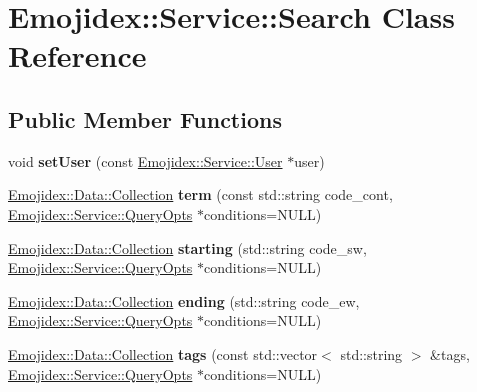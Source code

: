\hypertarget{classEmojidex_1_1Service_1_1Search}{}\section{Emojidex\+:\+:Service\+:\+:Search Class Reference}
\label{classEmojidex_1_1Service_1_1Search}
\subsection*{Public Member Functions}
\begin{DoxyCompactItemize}
\item 
void {\bfseries set\+User} (const \hyperlink{classEmojidex_1_1Service_1_1User}{Emojidex\+::\+Service\+::\+User} $\ast$user)\hypertarget{classEmojidex_1_1Service_1_1Search_ac29e36bb5aed38c8443b4457691a3e7a}{}\label{classEmojidex_1_1Service_1_1Search_ac29e36bb5aed38c8443b4457691a3e7a}

\item 
\hyperlink{classEmojidex_1_1Data_1_1Collection}{Emojidex\+::\+Data\+::\+Collection} {\bfseries term} (const std\+::string code\+\_\+cont, \hyperlink{classEmojidex_1_1Service_1_1QueryOpts}{Emojidex\+::\+Service\+::\+Query\+Opts} $\ast$conditions=N\+U\+LL)\hypertarget{classEmojidex_1_1Service_1_1Search_a7e9de234cfa8cdfe52b9ad02778ec096}{}\label{classEmojidex_1_1Service_1_1Search_a7e9de234cfa8cdfe52b9ad02778ec096}

\item 
\hyperlink{classEmojidex_1_1Data_1_1Collection}{Emojidex\+::\+Data\+::\+Collection} {\bfseries starting} (std\+::string code\+\_\+sw, \hyperlink{classEmojidex_1_1Service_1_1QueryOpts}{Emojidex\+::\+Service\+::\+Query\+Opts} $\ast$conditions=N\+U\+LL)\hypertarget{classEmojidex_1_1Service_1_1Search_a7b90f2dab9c28d2dc971bb7494b4d291}{}\label{classEmojidex_1_1Service_1_1Search_a7b90f2dab9c28d2dc971bb7494b4d291}

\item 
\hyperlink{classEmojidex_1_1Data_1_1Collection}{Emojidex\+::\+Data\+::\+Collection} {\bfseries ending} (std\+::string code\+\_\+ew, \hyperlink{classEmojidex_1_1Service_1_1QueryOpts}{Emojidex\+::\+Service\+::\+Query\+Opts} $\ast$conditions=N\+U\+LL)\hypertarget{classEmojidex_1_1Service_1_1Search_a0c8100ad888ab404088cd44b07bc8b91}{}\label{classEmojidex_1_1Service_1_1Search_a0c8100ad888ab404088cd44b07bc8b91}

\item 
\hyperlink{classEmojidex_1_1Data_1_1Collection}{Emojidex\+::\+Data\+::\+Collection} {\bfseries tags} (const std\+::vector$<$ std\+::string $>$ \&tags, \hyperlink{classEmojidex_1_1Service_1_1QueryOpts}{Emojidex\+::\+Service\+::\+Query\+Opts} $\ast$conditions=N\+U\+LL)\hypertarget{classEmojidex_1_1Service_1_1Search_af8d1aaece57cd92bf8712493055f2ef6}{}\label{classEmojidex_1_1Service_1_1Search_af8d1aaece57cd92bf8712493055f2ef6}


\end{DoxyCompactItemize}
